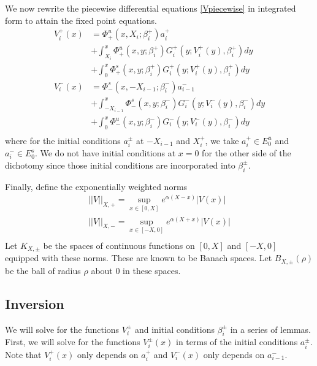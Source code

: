 \documentclass[thesis.tex]{subfiles}
\begin{document}
We now rewrite the piecewise differential equations \eqref{Vpiecewise} in integrated form to attain the fixed point equations.
\begin{equation}\label{FPequations}
\begin{aligned}
V_i^+(x) &= \Phi^u_+(x, X_i; \beta_i^+) a_i^+  \\
&+ \int_{X_i}^x \Phi_+^u(x, y; \beta_i^+) G_i^+(y; V_i^+(y),\beta_i^+)dy \\
&+ \int_0^x \Phi_+^s(x, y; \beta_i^+) G_i^+(y; V_i^+(y),\beta_i^+)dy \\ 
V_i^-(x) &= \Phi^s_-(x, -X_{i-1}; \beta_i^-) a_{i-1}^-  \\
&+ \int_{-X_{i-1}}^x \Phi_-^s(x, y; \beta_i^-) G_i^-(y; V_i^-(y),\beta_i^-)dy \\
&+ \int_0^x \Phi_-^u(x, y; \beta_i^-) G_i^-(y; V_i^-(y),\beta_i^-)dy \\
\end{aligned}
\end{equation}
where for the initial conditions $a_i^\pm$ at $-X_{i-1}$ and $X_i^+$, we take $a_i^+ \in E_0^u$ and $a_i^- \in E_0^s$. We do not have initial conditions at $x = 0$ for the other side of the dichotomy since those initial conditions are incorporated into $\beta_i^\pm$.

Finally, define the exponentially weighted norms
\begin{align*}
||V||_{X, +} = \sup_{x \in [0, X]} e^{\alpha(X - x)}|V(x)| \\
||V||_{X, -} = \sup_{x \in [-X, 0]} e^{\alpha(X + x)}|V(x)| \\
\end{align*}
Let $K_{X, \pm}$ be the spaces of continuous functions on $[0, X]$ and $[-X, 0]$ equipped with these norms. These are known to be Banach spaces. Let $B_{X, \pm}(\rho)$ be the ball of radius $\rho$ about $0$ in these spaces.

\subsection{Inversion}

We will solve for the functions $V_i^\pm$ and initial conditions $\beta_i^\pm$ in a series of lemmas. First, we will solve for the functions $V_i^\pm(x)$ in terms of the initial conditions $a_i^\pm$. Note that $V_i^+(x)$ only depends on $a_i^+$ and $V_i^-(x)$ only depends on $a_{i-1}^-$.

\end{document}
